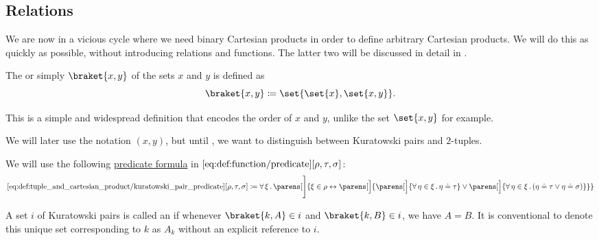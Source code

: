 \subsection{Relations}\label{subsec:relations}

\begin{definition}\label{def:tuple_and_cartesian_product}
  We are now in a vicious cycle where we need binary Cartesian products in order to define arbitrary Cartesian products. We will do this as quickly as possible, without introducing relations and functions. The latter two will be discussed in detail in .

  \begin{thmenum}
     The  or simply  \( \braket{ x, y } \) of the sets \( x \) and \( y \) is defined as
    \begin{equation*}
      \braket{ x, y } \coloneqq \set{ \set{ x }, \set{ x, y } }.
    \end{equation*}

    This is a simple and widespread definition that encodes the order of \( x \) and \( y \), unlike the set \( \set{ x, y } \) for example.

    We will later use the notation \( (x, y) \), but until , we want to distinguish between Kuratowski pairs and \( 2 \)-tuples.

    We will use the following \hyperref[rem:predicate_formula]{predicate formula} in \( \ref{eq:def:function/predicate}[\rho, \tau, \sigma] \):
    \begin{equation*}\taglabel[\op{IsPair}]{eq:def:tuple_and_cartesian_product/kuratowski_pair_predicate}
      \ref{eq:def:tuple_and_cartesian_product/kuratowski_pair_predicate}[\rho, \tau, \sigma] \coloneqq \qforall \xi \parens[\Bigg]{ \xi \in \rho \leftrightarrow \parens[\Big]{ \parens[\Big]{ \qforall {\eta \in \xi} \eta \doteq \tau } \vee \parens[\Big]{ \qforall {\eta \in \xi} (\eta \doteq \tau \vee \eta \doteq \sigma) } } }
    \end{equation*}

     A set \( i \) of Kuratowski pairs is called an  if whenever \( \braket{ k, A } \in i \) and \( \braket{ k, B } \in i \), we have \( A = B \). It is conventional to denote this unique set corresponding to \( k \) as \( A_k \) without an explicit reference to \( i \).


\end{thmenum}
\end{definition}
